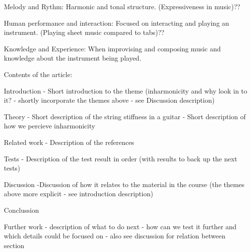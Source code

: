 Melody and Rythm:
Harmonic and tonal structure.
(Expressiveness in music)??

Human performance and interaction:
Focused on interacting and playing an instrument. 
(Playing sheet music compared to tabs)??

Knowledge and Experience:
When improvising and composing music and knowledge about the instrument being played.



Contents of the article:

Introduction - Short introduction to the theme (inharmonicity and why look in to it? - shortly incorporate the themes above - see Discussion description)

Theory 	- Short description of the string stiffness in a guitar
			- Short description of how we percieve inharmonicity

Related work - Description of the references

Tests - Description of the test result in order (with results to back up the next tests)

Discussion -Discussion of how it relates to the material in the course (the themes above more explicit - see introduction description)

Conclussion

Further work - description of what to do next - how can we test it further and which details could be focused on - also see discussion for relation between section